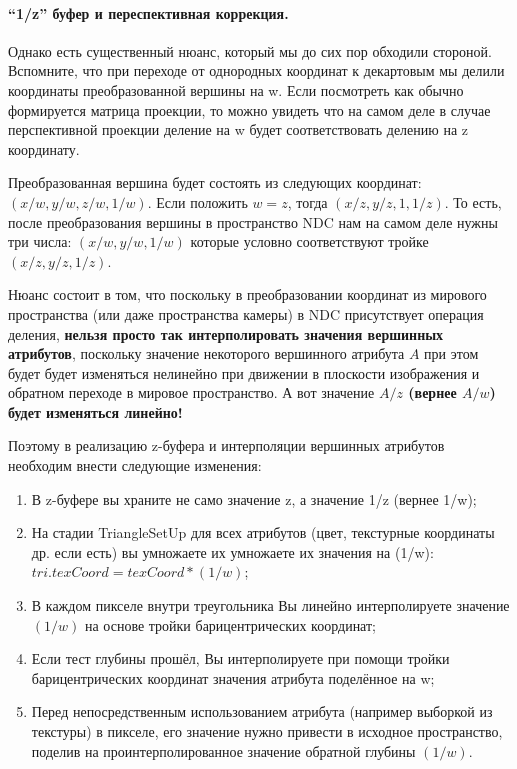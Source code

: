 \documentclass[12pt,subf,href,colorlinks=true]{article}
\begin{document}
\paragraph{``1/z'' буфер и переспективная коррекция.} Однако есть существенный нюанс, который мы до сих пор обходили стороной. Вспомните, что при переходе от однородных координат к декартовым мы делили координаты преобразованной вершины на w. Если посмотреть как обычно формируется матрица проекции, то можно увидеть что на самом деле в случае перспективной проекции деление на w будет соответствовать делению на z координату. 

Преобразованная вершина будет состоять из следующих координат: $(x/w, y/w, z/w, 1/w)$. Если положить $w=z$, тогда $(x/z, y/z, 1, 1/z)$. То есть, после преобразования вершины в пространство NDC нам на самом деле нужны три числа: $(x/w, y/w, 1/w)$ которые условно соответствуют тройке $(x/z, y/z, 1/z)$.

Нюанс состоит в том, что поскольку в преобразовании координат из мирового пространства (или даже пространства камеры) в NDC присутствует операция деления, \textbf{нельзя просто так интерполировать значения вершинных атрибутов}, поскольку значение некоторого вершинного атрибута $A$ при этом будет будет изменяться нелинейно при движении в плоскости изображения и обратном переходе в мировое пространство. А вот значение \textbf{$A/z$ (вернее $A/w$) будет изменяться линейно!} 

Поэтому в реализацию z-буфера и интерполяции вершинных атрибутов необходим внести следующие изменения:

\begin{enumerate}
\item В z-буфере вы храните не само значение z, а значение 1/z (вернее 1/w);
\item На стадии TriangleSetUp для всех атрибутов (цвет, текстурные координаты др. если есть) вы умножаете их умножаете их значения на (1/w): \newline $tri.texCoord = texCoord*(1/w)$;
\item В каждом пикселе внутри треугольника Вы линейно интерполируете значение $(1/w)$ на основе тройки барицентрических координат;
\item Если тест глубины прошёл, Вы интерполируете при помощи тройки барицентрических координат значения атрибута поделённое на w;
\item Перед непосредственным использованием атрибута (например выборкой из текстуры) в пикселе, его значение нужно привести в исходное пространство, поделив на проинтерполированное значение обратной глубины $(1/w)$.
\end{enumerate}
\end{document}
